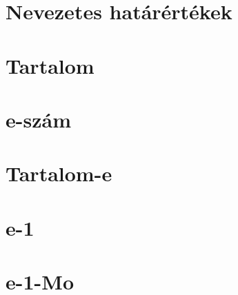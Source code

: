 






\begin{spacing}{1.2}


   \section*{Nevezetes határértékek}

   \section*{Tartalom} \label{Tart}
         \newline
      \newpage
      \section*{e-szám} \label{e}
      \section*{Tartalom-e} \label{Tarte}
         \newline
         \newpage
         \section*{e-1} \label{e1}
         \Fa{
            
         }
         \newpage
         \section*{e-1-Mo} \label{e1Mo}
         \Mo{
            
         }
         \newpage

\end{spacing}


